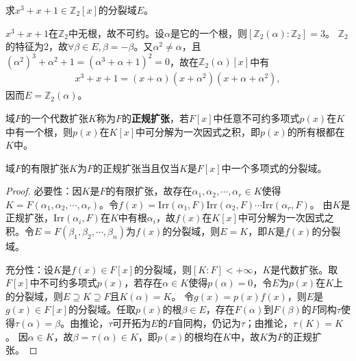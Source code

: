 \documentclass[../../main.tex]{subfiles}%
\begin{document}
\begin{example}
求$x^3+x+1\in\mathbb{Z}_2[x]$的分裂域$E$。
\end{example}

\begin{solution}

$x^3+x+1$在$\mathbb{Z}_2$中无根，故不可约。设$\alpha$是它的一个根，则$[\mathbb{Z}_2(\alpha):\mathbb{Z}_2]=3$。
$\mathbb{Z}_2$的特征为$2$，故$\forall\beta\in E,\beta=-\beta$。又$\alpha^2\neq\alpha$，且$(\alpha^2)^3+\alpha^2+1=(\alpha^3+\alpha+1)^2=0$，故在$\mathbb{Z}_2(\alpha)[x]$中有
\begin{align*}
x^3+x+1=(x+\alpha)(x+\alpha^2)(x+\alpha+\alpha^2),
\end{align*}
因而$E=\mathbb{Z}_2(\alpha)$。

\end{solution}

\begin{definition}
域$F$的一个代数扩张$K$称为$F$的\textbf{正规扩张}，若$F[x]$中任意不可约多项式$p(x)$在$K$中有一个根，则$p(x)$在$K[x]$中可分解为一次因式之积，即$p(x)$的所有根都在$K$中。
\end{definition}

\begin{theorem}
域$F$的有限扩张$K$为$F$的正规扩张当且仅当$K$是$F[x]$中一个多项式的分裂域。
\end{theorem}

\begin{proof}

必要性：因$K$是$F$的有限扩张，故存在$\alpha_1,\alpha_2,\cdots,\alpha_r\in K$使得$K=F(\alpha_1,\alpha_2,\cdots,\alpha_r)$。令$f(x)=\mathrm{Irr}(\alpha_1,F)\mathrm{Irr}(\alpha_2,F)\cdots\mathrm{Irr}(\alpha_r,F)$。
由$K$是正规扩张，$\mathrm{Irr}(\alpha_i,F)$在$K$中有根$\alpha_i$，故$f(x)$在$K[x]$中可分解为一次因式之积。令$E=F(\beta_1,\beta_2,\cdots,\beta_n)$为$f(x)$的分裂域，则$E=K$，即$K$是$f(x)$的分裂域。

充分性：设$K$是$f(x)\in F[x]$的分裂域，则$[K:F]<+\infty$，$K$是代数扩张。取$F[x]$中不可约多项式$p(x)$，若存在$\alpha\in K$使得$p(\alpha)=0$，令$E$为$p(x)$在$K$上的分裂域，则$E\supseteq K\supseteq F$且$K(\alpha)=K$。
令$g(x)=p(x)f(x)$，则$E$是$g(x)\in F[x]$的分裂域。任取$p(x)$的根$\beta\in E$，存在$F(\alpha)$到$F(\beta)$的$F$同构$\tau$使得$\tau(\alpha)=\beta$。由推论，$\tau$可开拓为$E$的$F$自同构，仍记为$\tau$；由推论，$\tau(K)=K$。
因$\alpha\in K$，故$\beta=\tau(\alpha)\in K$，即$p(x)$的根均在$K$中，故$K$为$F$的正规扩张。

\end{proof}
\end{document}
